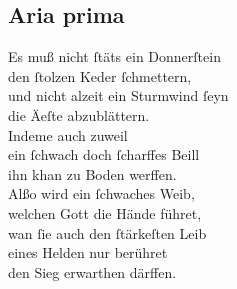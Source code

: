 \documentclass{ees}
\newenvironment{lyrics}[1]{%
  \subsection{#1}\nopagebreak%
  \begin{lyricslist}%
  \let\voice\item%
}{%
  \end{lyricslist}%
}
\begin{document}
\begin{lyrics}{Aria prima}
  \voice[Debora]
  Es muß nicht ſtäts ein Donnerſtein\\
  den ſtolzen Keder ſchmettern,\\
  und nicht alzeit ein Sturmwind ſeyn\\
  die Äeſte abzublättern.\\
  Indeme auch zuweil\\
  ein ſchwach doch ſcharffes Beill\\
  ihn khan zu Boden werffen.\\[1ex]
  Alßo wird ein ſchwaches Weib,\\
  welchen Gott die Hände führet,\\
  wan ſie auch den ſtärkeſten Leib\\
  eines Helden nur berühret\\
  den Sieg erwarthen därffen.
\end{lyrics}
\end{document}
